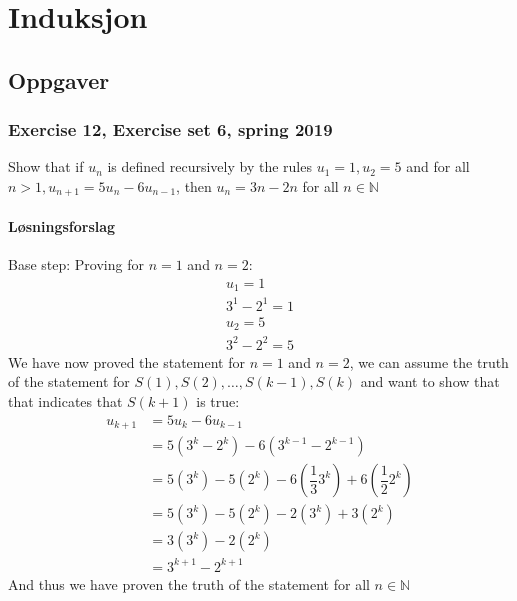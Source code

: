 \section{Induksjon}

\subsection{Oppgaver}

\subsubsection{Exercise 12, Exercise set 6, spring 2019}
Show that if $u_n$ is defined recursively by the 
rules $u_1 = 1,u_2 = 5$ and for all $n>1,u_{n+1}= 5u_n -6u_{n-1}$, then $u_n = 3n-2n$ for all $n\in \mathbb{N}$
\paragraph*{Løsningsforslag}
Base step: Proving for $n=1$ and $n=2$:
\begin{align*}
    u_1 = 1\\
    3^1-2^1 = 1\\
    u_2 = 5\\
    3^2-2^2 = 5
\end{align*}
We have now proved the statement for $n=1$ and $n=2$, we can assume the truth of the statement for $S(1), S(2), \dots,S(k-1), S(k)$ and want to show that that indicates that $S(k+1)$ is true:
\begin{align*}
    u_{k+1} &= 5u_{k}-6u_{k-1}\\
    &= 5(3^k-2^k)-6(3^{k-1}-2^{k-1})\\
    &= 5(3^k)-5(2^k)-6(\dfrac{1}{3}3^k)+6(\dfrac{1}{2}2^k)\\
    &= 5(3^k)-5(2^k)-2(3^k)+3(2^k)\\
    &= 3(3^k)-2(2^k)\\
    &= 3^{k+1}-2^{k+1}
\end{align*}
And thus we have proven the truth of the statement for all $n \in \mathbb{N}$